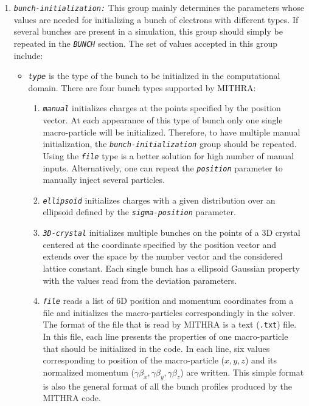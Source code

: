 \begin{enumerate}
\item {\tt \small \em bunch-initialization:} This group mainly determines the parameters whose values are needed for initializing a bunch of electrons with different types. If several bunches are present in a simulation, this group should simply be repeated in the {\tt \small \em BUNCH} section. The set of values accepted in this group include:
%
\begin{itemize}
\item {\tt \small \em type} is the type of the bunch to be initialized in the computational domain. There are four bunch types supported by MITHRA:
\begin{enumerate}
	\item {\tt \small \em manual} initializes charges at the points specified by the position vector. At each appearance of this type of bunch only one single macro-particle will be initialized. Therefore, to have multiple manual initialization, the {\tt \small \em bunch-initialization} group should be repeated. Using the {\tt \small \em file} type is a better solution for high number of manual inputs. Alternatively, one can repeat the {\tt \small \em position} parameter to manually inject several particles.
	\item {\tt \small \em ellipsoid} initializes charges with a given distribution over an ellipsoid defined by the {\tt \small \em sigma-position} parameter.
	\item {\tt \small \em 3D-crystal} initializes multiple bunches on the points of a 3D crystal centered at the coordinate specified by the position vector and extends over the space by the number vector and the considered lattice constant. Each single bunch has a ellipsoid Gaussian property with the values read from the deviation parameters.
	\item {\tt \small \em file} reads a list of 6D position and momentum coordinates from a file and initializes the macro-particles correspondingly in the solver. The format of the file that is read by MITHRA is a text ({\tt \small .txt}) file. In this file, each line presents the properties of one macro-particle that should be initialized in the code. In each line, six values corresponding to position of the macro-particle ($x, y, z$) and its normalized momentum ($\gamma\beta_x, \gamma\beta_y, \gamma\beta_z$) are written. This simple format is also the general format of all the bunch profiles produced by the MITHRA code.
\end{enumerate}

\end{itemize}
\end{enumerate}
